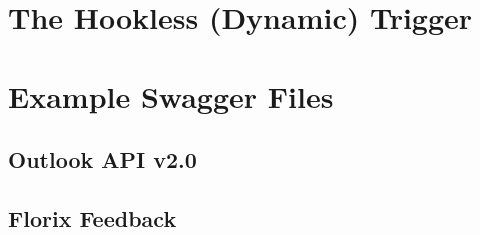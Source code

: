 \begin{appendices}
\section{The Hookless (Dynamic) Trigger}
\section{Example Swagger Files}
\subsection{Outlook API v2.0}
\subsection{Florix Feedback}
\end{appendices}